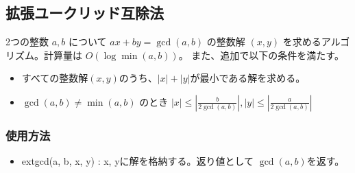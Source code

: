 \subsection{拡張ユークリッド互除法}

2つの整数 $a,b$ について $ax + by = \gcd(a,b)$ の整数解 $(x, y)$ を求めるアルゴリズム。計算量は $O(\log \min(a,b))$。
また、追加で以下の条件を満たす。

\begin{itemize}
    \item すべての整数解$(x,y)$のうち、$|x| + |y|$が最小である解を求める。
    \item $\gcd(a,b) \neq \min(a, b)$ のとき $|x| \le \left|\frac{b}{2\gcd(a,b)}\right|, |y| \le \left|\frac{a}{2\gcd(a,b)}\right|$
\end{itemize}

\subsubsection*{使用方法}

\begin{itemize}
    \item extgcd(a, b, x, y) : x, yに解を格納する。返り値として $\gcd(a,b)$を返す。
\end{itemize}


